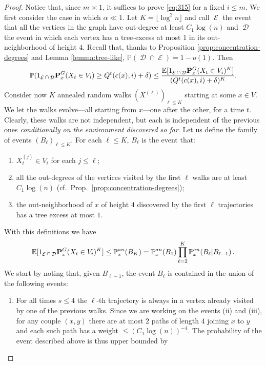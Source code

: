 \documentclass[10pt,a4paper]{amsart}
\newcommand{\E}{\mathbb{E}}
\newcommand{\PP}{\mathbb{P}}
\DeclareMathOperator{\cD}{\mathcal{D}}
\DeclareMathOperator{\cE}{\mathcal{E}}
\newcommand{\one}{\textup{\textbf{1}}}
\newcommand{\p}{\mathbb{P}}
\newcommand{\pan}{\p^{\textup{an}}}
\newcommand{\quenchG}{\mathbf{P}^G}
\newcommand{\semi}{{Q}}
\begin{document}
		\begin{proof} 
		Notice that, since $m\asymp 1$, it suffices to prove \eqref{eq:315} for a fixed $i\le m$.
            We first consider the case in which $\alpha\ll 1$. Let $K=\lfloor \log^2 n \rfloor$ and call $\cE$ the event that all the vertices in the graph have out-degree at least $C_1\log(n)$ and $\cD$ the event in which each vertex has a tree-excess at most $1$ in its out-neighborhood of height $4$. Recall that, thanks to  Proposition \ref{prop:concentration-degrees} and Lemma \ref{lemma:tree-like}, $\PP(\cD\cap \cE)=1-o(1)$.
			Then
			\begin{equation}
			\p(\one_{\cE\cap\cD}\quenchG_x(X_t\in V_i)\ge \semi^t(c(x),i)+ \delta) \le \frac{\E[\one_{\cE\cap\cD}\quenchG_x(X_t\in V_i)^K]}{(\semi^t(c(x),i)+ \delta)^K}.
			\end{equation}
			Consider now $K$ annealed random walks $(X^{(\ell)})_{\ell\le K}$ starting at some $x\in V$. We let the walks evolve---all starting from $x$---one after the other, for a time $t$. Clearly, these walks are not independent, but each is independent of the previous ones \emph{conditionally on the environment discovered so far}.
			Let us define the family of events $(B_\ell)_{\ell \le K}$. For each $\ell \le K$, $B_\ell$ is the event that:
			\begin{enumerate}
				\item[(i)] $X^{(j)}_t \in V_i$ for each $j \le \ell$;
				\item[(ii)] all the out-degrees of the vertices visited by the first $\ell$ walks are at least $C_1\log(n)$ (cf.~Prop.~\ref{prop:concentration-degrees});
				\item[(iii)] the out-neighborhood of $x$ of height $4$ discovered by the first $\ell$ trajectories has a tree excess at most $1$.
			\end{enumerate}
			With this definitions we have
			\begin{equation}
			\E[\one_{\cE\cap\cD}\quenchG_x(X_t\in V_i)^K] \le \pan_x(B_K)=\pan_x(B_1)\prod_{{\ell}=2}^{K} \pan_x( B_{{\ell}}| B_{{\ell}-1})\,.
			\end{equation}
			We start by noting that, given $B_{{\ell}-1}$, the event $B_{{\ell}}$ is contained in the union of the following events:
			\begin{enumerate}
				\item[(1)] For all times $s\le 4$ the $\ell$-th trajectory is always in a vertex already visited by one of the previous walks.
                Since we are working on the events (ii) and (iii), for any couple $(x,y)$ there are at most $2$ paths of length $4$ joining $x$ to $y$ and each such path has a weight $\le (C_1\log(n))^{-4}$. The probability of the event described above is thus upper bounded by

\end{enumerate}
\end{proof}
\end{document}
